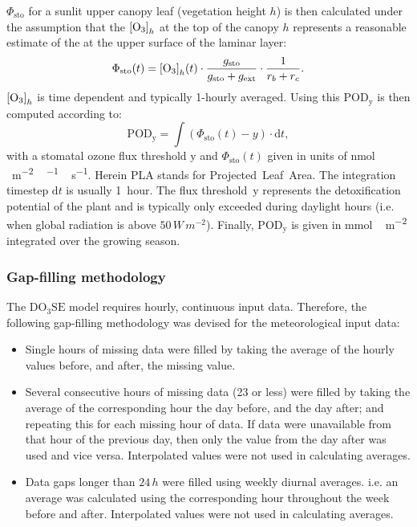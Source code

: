 \documentclass[bg, manuscript]{copernicus}
\begin{document}
$\Phi_\mathrm{sto}$ for a sunlit upper canopy leaf (vegetation height $h$) is then calculated under the assumption that the $\chem{[O_3]}_h$ at the top of the canopy $h$ represents a reasonable estimate of the \chem{[O_3]} at the upper surface of the laminar layer:
%
\begin{equation}
  \Phi_\mathrm{sto}(t) = \chem{[O_3]}_h(t) \cdot \frac{g_\mathrm{sto}}{g_\mathrm{sto}+g_\mathrm{ext}} \cdot \frac{1}{r_b+r_c}.
  \label{eq:flux_stomata}
\end{equation}
$\chem{[O_3]}_h$ is time dependent and typically 1-hourly averaged. Using this $\mathrm{POD_y}$ is then computed according to:
%
\begin{equation}
  \mathrm{POD_y} = \int{(\Phi_\mathrm{sto}(t)-y)\cdot \mathrm{d}t},
  \label{eq:pod}
\end{equation}
%
with a stomatal ozone flux threshold $\mathrm{y}$ and $\Phi_\mathrm{sto}(t)$ given in units of \unit{nmol\,\,m^{-2}\,^{-1}\,s^{-1}}. Herein PLA stands for Projected~Leaf~Area. The integration timestep $\mathrm{d}t$ is usually 1~hour. The flux threshold~$\mathrm{y}$ represents the detoxification potential of the plant and is typically only exceeded during daylight hours (i.e. when global radiation is above $50\,\unit{W\,m^{-2}}$). Finally, $\mathrm{POD_y}$ is given in \unit{mmol\,m^{-2}} integrated over the growing season.

\subsubsection{Gap-filling methodology}
\label{subsec:gap_filling}
The $\mathrm{DO_3SE}$ model requires hourly, continuous input data. Therefore, the following gap-filling methodology was devised for the meteorological input data:
\begin{itemize}
\item Single hours of missing data were filled by taking the average of the hourly values before, and after, the missing value.
\item Several consecutive hours of missing data (23 or less) were filled by taking the average of the corresponding hour the day before, and the day after; and repeating this for each missing hour of data. If data were unavailable from that hour of the previous day, then only the value from the day after was used and vice versa. Interpolated values were not used in calculating averages.
\item Data gaps longer than $24\,\unit{h}$ were filled using weekly diurnal averages. i.e. an average was calculated using the corresponding hour throughout the week before and after. Interpolated values were not used in calculating averages.
\end{itemize}
\end{document}
